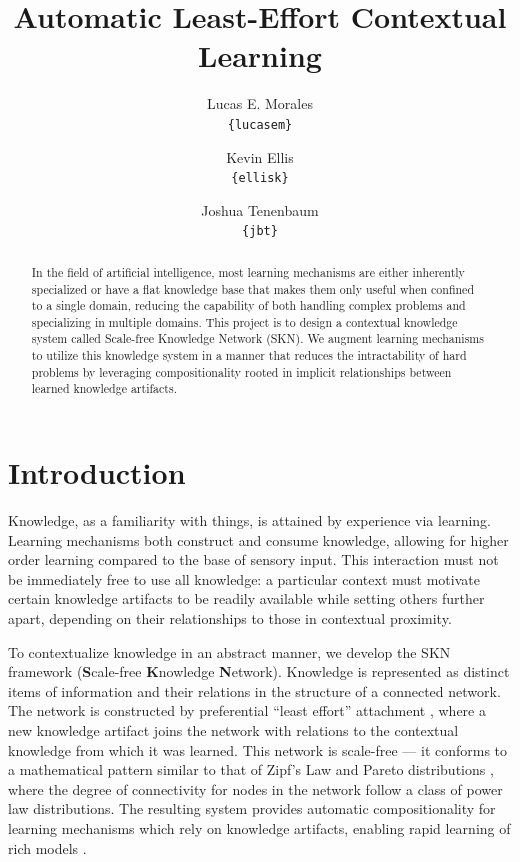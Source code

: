 \documentclass[11pt,letterpaper]{article}
\title{{Automatic Least-Effort Contextual Learning}}
\author{Lucas E. Morales\\{\tt \{lucasem\}}
\and Kevin Ellis\\{\tt \{ellisk\}}
\and Joshua Tenenbaum\\{\tt \{jbt\}}}
\date{}
\begin{document}
\maketitle

\begin{abstract}
  In the field of artificial intelligence, most learning mechanisms are
  either inherently specialized or have a flat knowledge base that makes
  them only useful when confined to a single domain, reducing the capability
  of both handling complex problems and specializing in multiple domains.
  This project is to design a contextual knowledge system called Scale-free
  Knowledge Network (SKN). We augment learning mechanisms to utilize this
  knowledge system in a manner that reduces the intractability of hard
  problems by leveraging compositionality rooted in implicit relationships
  between learned knowledge artifacts.
\end{abstract}


\section{Introduction}

Knowledge, as a familiarity with things, is attained by experience via
learning. Learning mechanisms both construct and consume knowledge, allowing
for higher order learning compared to the base of sensory input. This
interaction must not be immediately free to use all knowledge: a particular
context must motivate certain knowledge artifacts to be readily available
while setting others further apart, depending on their relationships to
those in contextual proximity.

To contextualize knowledge in an abstract manner, we develop the SKN
framework ({\bf S}cale-free {\bf K}nowledge {\bf N}etwork). Knowledge is
represented as distinct items of information and their relations in the
structure of a connected network. The network is constructed by preferential
``least effort'' attachment \cite{barabasi99}\cite{cancho03}, where a new
knowledge artifact joins the network with relations to the contextual
knowledge from which it was learned. This network is scale-free --- it
conforms to a mathematical pattern similar to that of Zipf's Law and Pareto
distributions \cite{zipf49}\cite{barabasi16}, where the degree of
connectivity for nodes in the network follow a class of power law
distributions. The resulting system provides automatic compositionality for
learning mechanisms which rely on knowledge artifacts, enabling rapid
learning of rich models \cite{lake16}.
\end{document}
